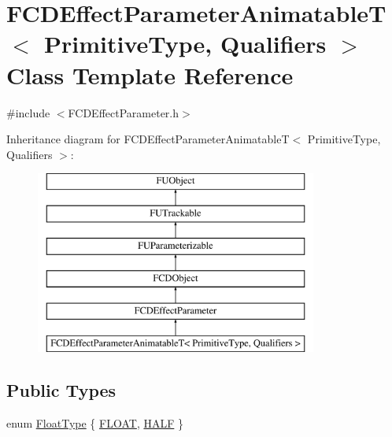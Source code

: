 \hypertarget{classFCDEffectParameterAnimatableT}{
\section{FCDEffectParameterAnimatableT$<$ PrimitiveType, Qualifiers $>$ Class Template Reference}
\label{classFCDEffectParameterAnimatableT}
}


{\ttfamily \#include $<$FCDEffectParameter.h$>$}

Inheritance diagram for FCDEffectParameterAnimatableT$<$ PrimitiveType, Qualifiers $>$:\begin{figure}[H]
\begin{center}
\leavevmode
\includegraphics[height=6.000000cm]{classFCDEffectParameterAnimatableT}
\end{center}
\end{figure}
\subsection*{Public Types}
\begin{DoxyCompactItemize}
\item 
enum \hyperlink{classFCDEffectParameterAnimatableT_a8cc624ded1c773fd65851d213573e8b1}{FloatType} \{ \hyperlink{classFCDEffectParameterAnimatableT_a8cc624ded1c773fd65851d213573e8b1ac9547c18b1292ca978765dda33d09ed1}{FLOAT}, 
\hyperlink{classFCDEffectParameterAnimatableT_a8cc624ded1c773fd65851d213573e8b1a0f1f9490970710f8c80173b3d8fa37ff}{HALF}
 \}
\end{DoxyCompactItemize}

